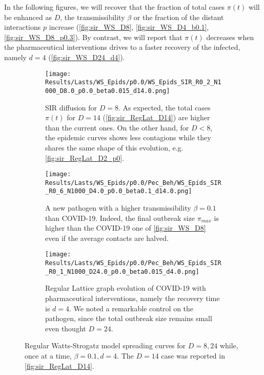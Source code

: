 \documentclass[a4paper,10pt]{book} %
\theoremstyle{definition}
\begin{document}
In the following figures, we will recover that the fraction of total cases $\pi(t)$ will be enhanced as $ D$, the transmissibility $ \beta$ or the fraction of the distant interactions $ p$ increase (\autoref{fig:sir_WS_D8}, \autoref{fig:sir_WS_D4_b0.1}, \autoref{fig:sir_WS_D8_p0.3}). By contrast, we will report that $ \pi(t)$ decreases when the pharmaceutical interventions drives to a faster recovery of the infected, namely $ d = 4$ (\autoref{fig:sir_WS_D24_d4}).

\begin{figure}[hbtp]
    \centering
	\begin{subfigure}[t]{\textwidth}
        \centering
        \texttt{[image: Results/Lasts/WS\_Epids/p0.0/WS\_Epids\_SIR\_R0\_2\_N1000\_D8.0\_p0.0\_beta0.015\_d14.0.png]} 
        \caption{SIR diffusion for $ D = 8$. As expected, the total cases $ \pi(t)$ for $ D = 14$   (\autoref{fig:sir_RegLat_D14}) are higher than the current ones. On the other hand, for $ D < 8$, the epidemic curves shows less contagions while they shares the same shape of this evolution, e.g. \autoref{fig:sir_RegLat_D2_p0}.} 
		\label{fig:sir_WS_D8}
	\end{subfigure}
	\vfill
    \begin{subfigure}[t]{\textwidth}
        \centering
        \texttt{[image: Results/Lasts/WS\_Epids/p0.0/Pec\_Beh/WS\_Epids\_SIR\_R0\_6\_N1000\_D4.0\_p0.0\_beta0.1\_d14.0.png]} 
        \caption{A new pathogen with a higher transmissibility $ \beta = 0.1$ than COVID-19. Indeed, the final outbreak size $\pi_{max} $ is higher than the COVID-19 one of \autoref{fig:sir_WS_D8} even if the average contacts are halved.} 
		\label{fig:sir_WS_D4_b0.1}
    \end{subfigure}
	\vfill
    \begin{subfigure}[t]{\textwidth}
        \centering
        \texttt{[image: Results/Lasts/WS\_Epids/p0.0/Pec\_Beh/WS\_Epids\_SIR\_R0\_1\_N1000\_D24.0\_p0.0\_beta0.015\_d4.0.png]} 
        \caption{Regular Lattice graph evolution of COVID-19 with pharmaceutical interventions, namely the recovery time is $ d = 4$. We noted a remarkable control on the pathogen, since the total outbreak size remains small even thought $ D = 24$.} 
		\label{fig:sir_WS_D24_d4}
    \end{subfigure}
    \caption{Regular Watts-Strogatz model spreading curves for $D = 8, 24$ while, once at a time, $ \beta = 0.1, d = 4$. The $ D = 14$ case was reported in \autoref{fig:sir_RegLat_D14}.}
	\label{fig:sir_WS_D5D5b0.1_D24d4}
\end{figure}
\end{document}
